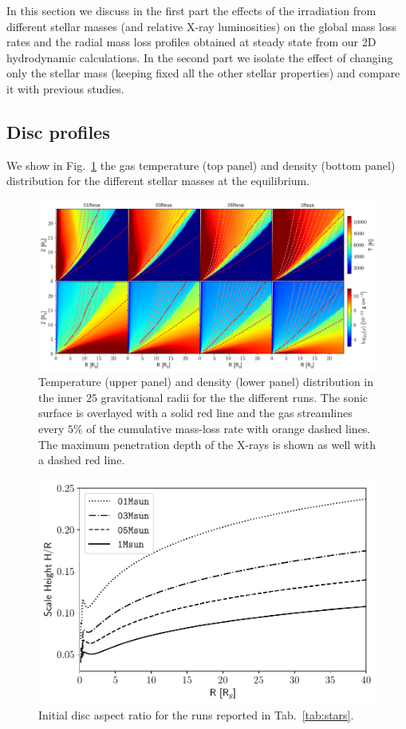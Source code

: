\documentclass[usenatbib,useAMS,usedcolumn]{mnras}
\begin{document}
In this section we discuss in the first part the effects of the irradiation from different stellar masses (and relative X-ray luminosities) on the global mass loss rates and the radial mass loss profiles obtained at steady state from our 2D hydrodynamic calculations. In the second part we isolate the effect of changing only the stellar mass (keeping fixed all the other stellar properties) and compare it with previous studies.

\subsection{Disc profiles}
We show in Fig.~\ref{fig:discs} the gas temperature (top panel) and density (bottom panel) distribution for the different stellar masses at the equilibrium.
\begin{figure}
    \centering
    \includegraphics[width=\textwidth]{Figure4}
    \caption{Temperature (upper panel) and density (lower panel) distribution in the inner $25$ gravitational radii for the the different runs. The sonic surface is overlayed with a solid red line and the gas streamlines every $5\%$ of the cumulative mass-loss rate with orange dashed lines. The maximum penetration depth of the X-rays is shown as well with a dashed red line. \label{fig:discs}}
\end{figure}
\begin{figure}
    \centering
    \includegraphics[width=\columnwidth]{Figure5}
    \caption{Initial disc aspect ratio for the runs reported in Tab.~\ref{tab:stars}. \label{fig:aspectratio}}
\end{figure}
\end{document}
